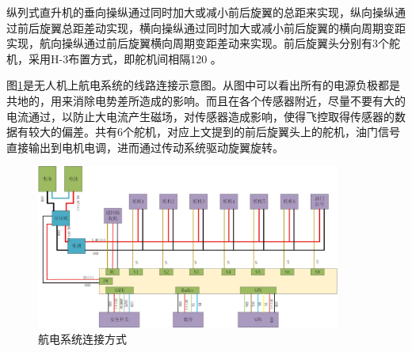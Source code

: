 纵列式直升机的垂向操纵通过同时加大或减小前后旋翼的总距来实现，纵向操纵通过前后旋翼总距差动实现，横向操纵通过同时加大或减小前后旋翼的横向周期变距实现，航向操纵通过前后旋翼横向周期变距差动来实现。前后旋翼头分别有3个舵机，采用H-3布置方式，即舵机间相隔120 \degree。

图\ref{fig:chap7:elec}是无人机上航电系统的线路连接示意图。从图中可以看出所有的电源负极都是共地的，用来消除电势差所造成的影响。而且在各个传感器附近，尽量不要有大的电流通过，以防止大电流产生磁场，对传感器造成影响，使得飞控取得传感器的数据有较大的偏差。共有6个舵机，对应上文提到的前后旋翼头上的舵机，油门信号直接输出到电机电调，进而通过传动系统驱动旋翼旋转。
\begin{figure}[htb!]
    \centering
    \includegraphics[width = 10cm]{fig/figure_chap7/electric.jpg}
    \caption{航电系统连接方式\label{fig:chap7:elec}}
\end{figure}


